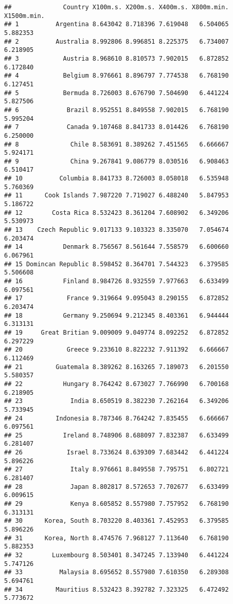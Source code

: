\documentclass[
]{article}
\begin{document}
\begin{verbatim}
##              Country X100m.s. X200m.s. X400m.s. X800m.min. X1500m.min.
## 1          Argentina 8.643042 8.718396 7.619048   6.504065    5.882353
## 2          Australia 8.992806 8.996851 8.225375   6.734007    6.218905
## 3            Austria 8.968610 8.810573 7.902015   6.872852    6.172840
## 4            Belgium 8.976661 8.896797 7.774538   6.768190    6.127451
## 5            Bermuda 8.726003 8.676790 7.504690   6.441224    5.827506
## 6             Brazil 8.952551 8.849558 7.902015   6.768190    5.995204
## 7             Canada 9.107468 8.841733 8.014426   6.768190    6.250000
## 8              Chile 8.583691 8.389262 7.451565   6.666667    5.924171
## 9              China 9.267841 9.086779 8.030516   6.908463    6.510417
## 10          Columbia 8.841733 8.726003 8.058018   6.535948    5.760369
## 11      Cook Islands 7.987220 7.719027 6.488240   5.847953    5.186722
## 12        Costa Rica 8.532423 8.361204 7.608902   6.349206    5.530973
## 13    Czech Republic 9.017133 9.103323 8.335070   7.054674    6.203474
## 14           Denmark 8.756567 8.561644 7.558579   6.600660    6.067961
## 15 Domincan Republic 8.598452 8.364701 7.544323   6.379585    5.506608
## 16           Finland 8.984726 8.932559 7.977663   6.633499    6.097561
## 17            France 9.319664 9.095043 8.290155   6.872852    6.203474
## 18           Germany 9.250694 9.212345 8.403361   6.944444    6.313131
## 19     Great Britian 9.009009 9.049774 8.092252   6.872852    6.297229
## 20            Greece 9.233610 8.822232 7.911392   6.666667    6.112469
## 21         Guatemala 8.389262 8.163265 7.189073   6.201550    5.580357
## 22           Hungary 8.764242 8.673027 7.766990   6.700168    6.218905
## 23             India 8.650519 8.382230 7.262164   6.349206    5.733945
## 24         Indonesia 8.787346 8.764242 7.835455   6.666667    6.097561
## 25           Ireland 8.748906 8.688097 7.832387   6.633499    6.281407
## 26            Israel 8.733624 8.639309 7.683442   6.441224    5.896226
## 27             Italy 8.976661 8.849558 7.795751   6.802721    6.281407
## 28             Japan 8.802817 8.572653 7.702677   6.633499    6.009615
## 29             Kenya 8.605852 8.557980 7.757952   6.768190    6.313131
## 30      Korea, South 8.703220 8.403361 7.452953   6.379585    5.896226
## 31      Korea, North 8.474576 7.968127 7.113640   6.768190    5.882353
## 32        Luxembourg 8.503401 8.347245 7.133940   6.441224    5.747126
## 33          Malaysia 8.695652 8.557980 7.610350   6.289308    5.694761
## 34         Mauritius 8.532423 8.392782 7.323325   6.472492    5.773672

\end{verbatim}
\end{document}
